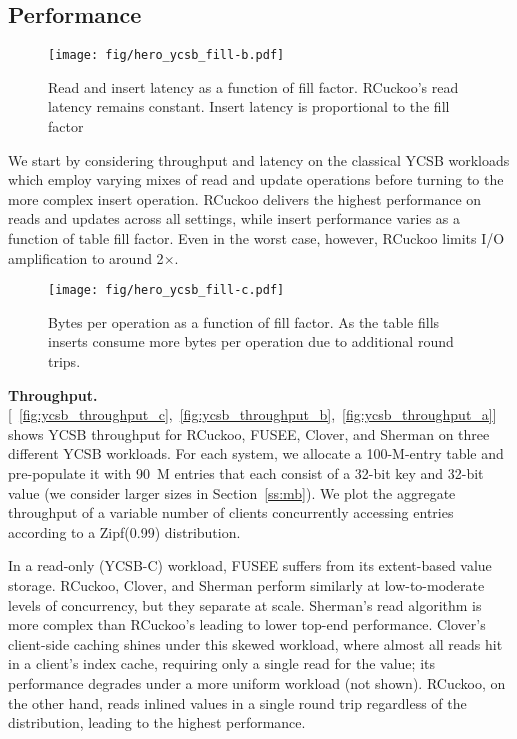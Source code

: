 \subsection{Performance}

\begin{figure}
  \center
  \texttt{[image: fig/hero\_ycsb\_fill-b.pdf]}
  \caption{Read and insert latency as a function of fill factor. RCuckoo's read latency remains constant. Insert latency is proportional to the fill factor}
  \label{fig:ycsb_fill-b}
\end{figure}

We start by considering throughput and latency on the classical YCSB
workloads which employ varying mixes of read and update operations
before turning to the more complex insert operation.  RCuckoo delivers
the highest performance on reads and updates across all settings,
while insert performance varies as a function of table fill factor.
Even in the worst case, however, RCuckoo limits I/O amplification to
around 2$\times$.


\begin{figure}
  \center
  \texttt{[image: fig/hero\_ycsb\_fill-c.pdf]}
  \caption{Bytes per operation as a function of fill factor. As the table fills inserts consume more bytes per operation due to additional round trips.}
  \label{fig:ycsb_fill-c}
\end{figure}



\textbf{Throughput.} 
[~\ref{fig:ycsb_throughput_c},~\ref{fig:ycsb_throughput_b},~\ref{fig:ycsb_throughput_a}] shows YCSB
throughput for RCuckoo, FUSEE, Clover, and Sherman on three different YCSB workloads. For each
system, we allocate a 100-M-entry table and pre-populate it with 90~M entries that each consist of a
32-bit key and 32-bit value (we consider larger sizes in Section~\ref{ss:mb}).  We plot the
aggregate throughput of a variable number of clients concurrently accessing entries according to a
Zipf(0.99) distribution.

In a read-only (YCSB-C) workload, FUSEE suffers from its extent-based
value storage.  RCuckoo, Clover, and Sherman perform similarly at
low-to-moderate levels of concurrency, but they separate at scale.
Sherman's read algorithm is more complex than RCuckoo's leading to
lower top-end performance.  Clover's client-side caching shines under
this skewed workload, where almost all reads hit in a client's index
cache, requiring only a single read for the value; its performance
degrades under a more uniform workload (not shown).  RCuckoo, on the
other hand, reads inlined values in a single round trip
regardless of the distribution, leading to the highest performance.

